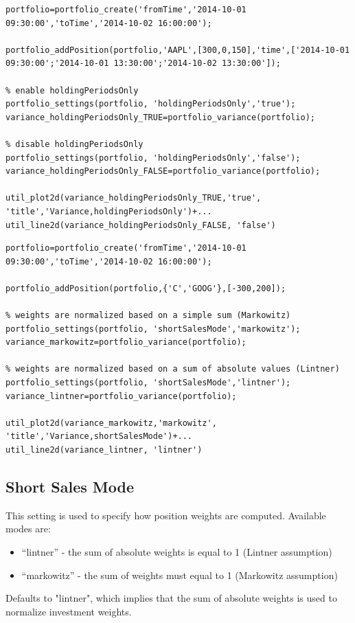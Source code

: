 \documentclass[letterpaper]{report}
\begin{document}
\begin{lstlisting}
portfolio=portfolio_create('fromTime','2014-10-01 09:30:00','toTime','2014-10-02 16:00:00');

portfolio_addPosition(portfolio,'AAPL',[300,0,150],'time',['2014-10-01 09:30:00';'2014-10-01 13:30:00';'2014-10-02 13:30:00']);

% enable holdingPeriodsOnly
portfolio_settings(portfolio, 'holdingPeriodsOnly','true');
variance_holdingPeriodsOnly_TRUE=portfolio_variance(portfolio);

% disable holdingPeriodsOnly
portfolio_settings(portfolio, 'holdingPeriodsOnly','false');
variance_holdingPeriodsOnly_FALSE=portfolio_variance(portfolio);

util_plot2d(variance_holdingPeriodsOnly_TRUE,'true', 'title','Variance,holdingPeriodsOnly')+...
util_line2d(variance_holdingPeriodsOnly_FALSE, 'false')
\end{lstlisting}

\begin{lstlisting}
portfolio=portfolio_create('fromTime','2014-10-01 09:30:00','toTime','2014-10-02 16:00:00');

portfolio_addPosition(portfolio,{'C','GOOG'},[-300,200]);

% weights are normalized based on a simple sum (Markowitz)
portfolio_settings(portfolio, 'shortSalesMode','markowitz');
variance_markowitz=portfolio_variance(portfolio);

% weights are normalized based on a sum of absolute values (Lintner)
portfolio_settings(portfolio, 'shortSalesMode','lintner');
variance_lintner=portfolio_variance(portfolio);

util_plot2d(variance_markowitz,'markowitz', 'title','Variance,shortSalesMode')+...
util_line2d(variance_lintner, 'lintner')
\end{lstlisting}

\subsection {Short Sales Mode}
This setting is used to specify how position weights are computed. Available modes are:
\begin{itemize} 
  \item  ``lintner'' - the sum of absolute weights is equal to 1 (Lintner
  assumption)
  \item ``markowitz'' - the sum of weights must equal to 1 (Markowitz
  assumption)
\end{itemize}
Defaults to "lintner", which implies that the sum of absolute weights is used to normalize investment weights.
\end{document}
